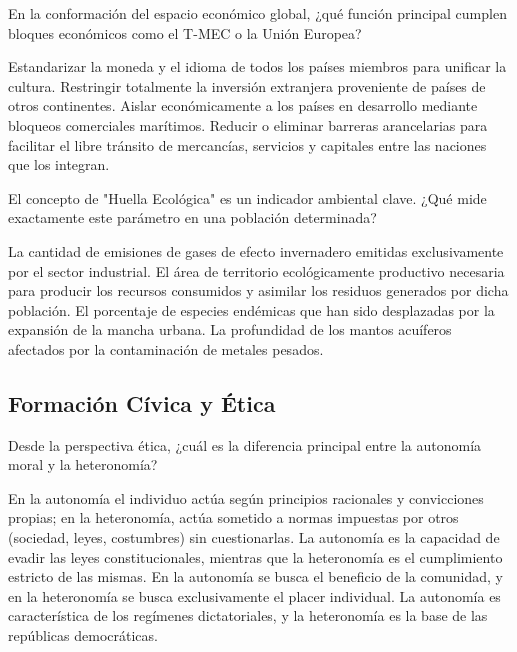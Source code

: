 \documentclass[12pt]{evaluasep}
\begin{document}
\begin{questions}
    \question En la conformación del espacio económico global, ¿qué función principal cumplen bloques económicos como el T-MEC o la Unión Europea?
    \begin{choices}
        \choice Estandarizar la moneda y el idioma de todos los países miembros para unificar la cultura.
        \choice Restringir totalmente la inversión extranjera proveniente de países de otros continentes.
        \choice Aislar económicamente a los países en desarrollo mediante bloqueos comerciales marítimos.
        \CorrectChoice Reducir o eliminar barreras arancelarias para facilitar el libre tránsito de mercancías, servicios y capitales entre las naciones que los integran.
    \end{choices}
	

    \question El concepto de "Huella Ecológica" es un indicador ambiental clave. ¿Qué mide exactamente este parámetro en una población determinada?
    \begin{choices}
        \choice La cantidad de emisiones de gases de efecto invernadero emitidas exclusivamente por el sector industrial.
        \CorrectChoice El área de territorio ecológicamente productivo necesaria para producir los recursos consumidos y asimilar los residuos generados por dicha población.
        \choice El porcentaje de especies endémicas que han sido desplazadas por la expansión de la mancha urbana.
        \choice La profundidad de los mantos acuíferos afectados por la contaminación de metales pesados.
    \end{choices}
	

    \subsection{Formación Cívica y Ética}

    \question Desde la perspectiva ética, ¿cuál es la diferencia principal entre la autonomía moral y la heteronomía?
    \begin{choices}
        \CorrectChoice En la autonomía el individuo actúa según principios racionales y convicciones propias; en la heteronomía, actúa sometido a normas impuestas por otros (sociedad, leyes, costumbres) sin cuestionarlas.
        \choice La autonomía es la capacidad de evadir las leyes constitucionales, mientras que la heteronomía es el cumplimiento estricto de las mismas.
        \choice En la autonomía se busca el beneficio de la comunidad, y en la heteronomía se busca exclusivamente el placer individual.
        \choice La autonomía es característica de los regímenes dictatoriales, y la heteronomía es la base de las repúblicas democráticas.
    \end{choices}
	


\end{questions}
\end{document}
